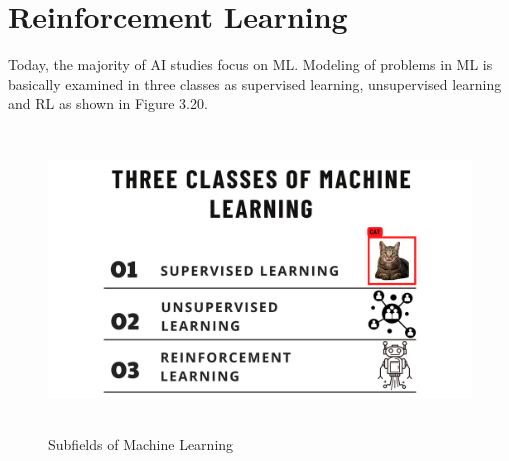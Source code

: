 \documentclass[12pt,twoside,a4]{mwbk}
\begin{document}
\section{Reinforcement Learning}
Today, the majority of AI studies focus on ML. Modeling of problems in ML is basically examined in three classes as supervised learning, unsupervised learning and RL as shown in Figure 3.20.
\begin{figure}[h]
    \centering
    \includegraphics[width=14.0cm, height=8.0cm]{ML.png}
    \caption{Subfields of Machine Learning}
\end{figure}
\end{document}
